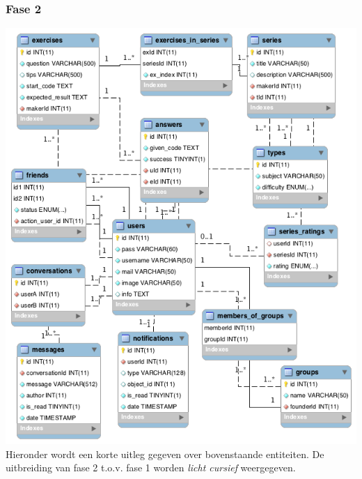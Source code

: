 \subsubsection{Fase 2}
\mbox{\hspace{-6ex}\includegraphics[keepaspectratio=true, scale=0.6]{raport_files/design/UML2.png}}\\
\small Hieronder wordt een korte uitleg gegeven over bovenstaande entiteiten. De uitbreiding van fase 2 t.o.v. fase 1
worden \textsl{licht cursief} weergegeven.
\normalsize
